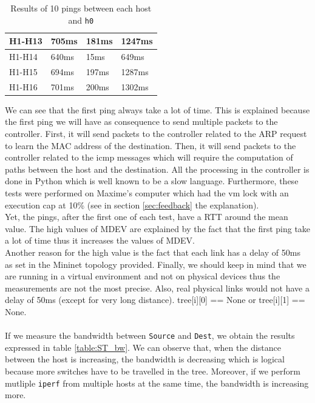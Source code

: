 \documentclass[a4paper, 11pt, oneside]{article}
\begin{document}
\begin{table}[H]
\begin{tabular}{|l|l|l|l|}
H1-H13                                     & 705ms                              & 181ms                              & 1247ms                                 \\ \hline
H1-H14                                     & 640ms                              & 15ms                              & 649ms                                 \\ \hline
H1-H15                                     & 694ms                              & 197ms                              & 1287ms                                 \\ \hline
H1-H16                                     & 701ms                              & 200ms                              & 1302ms                                 \\ \hline
\end{tabular}
\caption{Results of 10 pings between each host and \texttt{h0}}
\label{table:STCPings}
\end{table}
We can see that the first ping always take a lot of time. This is explained because the first ping we will have as consequence to send multiple packets to the controller. First, it will send packets to the controller related to the ARP request to learn the MAC address of the destination. Then, it will send packets to the controller related to the icmp messages which will require the computation of paths between the host and the destination. All the processing in the controller is done in Python which is well known to be a slow language. Furthermore, these tests were performed on Maxime's computer which had the vm lock with an execution cap at 10\% (see in section \ref{sec:feedback} the explanation).\\
Yet, the pings, after the first one of each test, have a RTT around the mean value. The high values of MDEV are explained by the fact that the first ping take a lot of time thus it increases the values of MDEV.\\
Another reason for the high value is the fact that each link has a delay of 50ms as set in the Mininet topology provided. Finally, we should keep in mind that we are running in a virtual environment and not on physical devices thus the measurements are not the most precise. Also, real physical links would not have a delay of 50ms (except for very long distance).
tree[i][0] == None or tree[i][1] == None.

\paragraph{}If we measure the bandwidth between \texttt{Source} and \texttt{Dest}, we obtain the results expressed in table \ref{table:ST_bw}. We can observe that, when the distance between the host is increasing, the bandwidth is decreasing which is logical because more switches have to be travelled in the tree. Moreover, if we perform mutliple \texttt{iperf} from multiple hosts at the same time, the bandwidth is increasing more.
\end{document}
